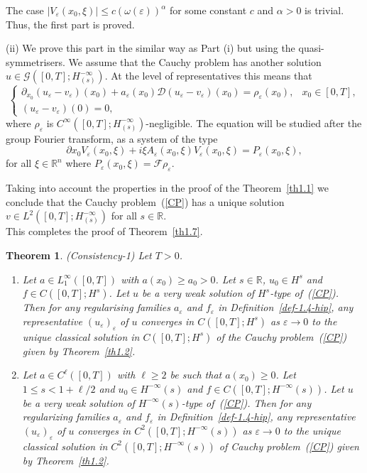 \documentclass[12pt]{amsart}
\newtheorem{theorem}{Theorem}[section]
\theoremstyle{definition}
\begin{document}
The case $|V_\varepsilon(x_0, \xi)| \leq c (\omega(\varepsilon))^\alpha$ for some constant $c$ and $\alpha > 0$ is trivial. Thus, the first part is proved.


\vspace{0.5cm}
(ii) We prove this part in the similar way as Part (i) but using the quasi-symmetrisers. We assume that the Cauchy problem has another solution $u \in \mathcal{G}([0, T]; H^{-\infty}_{(s)})$. At the level of representatives this means that
\[
\begin{cases}
\partial_{x_0} (u_\varepsilon - v_\varepsilon)(x_0) + a_\varepsilon(x_0)\mathcal{D}(u_\varepsilon - v_\varepsilon)(x_0) = \rho_\varepsilon(x_0), & x_0 \in [0, T], \\
(u_\varepsilon - v_\varepsilon)(0) = 0,
\end{cases}
\]
where $\rho_\varepsilon$ is $C^\infty([0, T]; H^{-\infty}_{(s)})$-negligible. 
The equation will be studied after the group Fourier transform, as a system of the type
\[
\partial{x_0} V_\varepsilon(x_0, \xi) + i \xi A_\varepsilon(x_0, \xi) V_\varepsilon(x_0, \xi)= P_\varepsilon(x_0, \xi),
\]
for all $\xi \in \mathbb{R}^n$ where $P_\varepsilon(x_0, \xi) = \mathcal{F}\rho_\varepsilon$.


Taking into account the properties in the proof of the Theorem~\ref{th1.1} we conclude that the Cauchy problem~(\ref{CP}) has a unique solution $v \in L^2([0, T]; H^{-\infty}_{(s)})$ for all $s \in \mathbb{R}$.\\
This completes the proof of Theorem~\ref{th1.7}. 

\begin{theorem}(Consistency-1)
\label{th1.8}
Let $T > 0$.
\begin{enumerate}
    \item[(i)] Let $a \in L^\infty_1([0, T])$ with $a(x_0) \geq a_0 > 0$. Let $s \in \mathbb{R}$, $u_0 \in H^{s}$ and $f \in C([0, T]; H^s)$. Let $u$ be a very weak solution of $H^s$-type of~(\ref{CP}). Then for any regularising families $a_\varepsilon$ and $f_\varepsilon$ in Definition~\ref{def-1.4-hip}, any representative $(u_\varepsilon)_\varepsilon$ of $u$ converges in $C([0, T]; H^{s})$ as $\varepsilon \to 0$ to the unique classical solution in $C([0, T]; H^{s})$ of the Cauchy problem~(\ref{CP}) given by Theorem~\ref{th1.2}.
    
    \item[(ii)] Let $a \in C^\ell([0, T])$ with $\ell \geq 2$ be such that $a(x_0) \geq 0$. Let $1 \leq s < 1 + \ell/2$ and $u_0\in H^{-\infty}(s)$ and $f \in C([0, T]; H^{-\infty}(s))$. Let $u$ be a very weak solution of $H^{-\infty}(s)$-type of~(\ref{CP}). Then for any regularizing families $a_\varepsilon$ and $f_\varepsilon$ in Definition~\ref{def-1.4-hip}, any representative $(u_\varepsilon)_\varepsilon$ of $u$ converges in $C^2([0, T]; H^{-\infty}(s))$ as $\varepsilon \to 0$ to the unique classical solution in $C^2([0, T]; H^{-\infty}(s))$ of Cauchy problem~(\ref{CP}) given by Theorem~\ref{th1.2}.
\end{enumerate}
\end{theorem}
\end{document}
